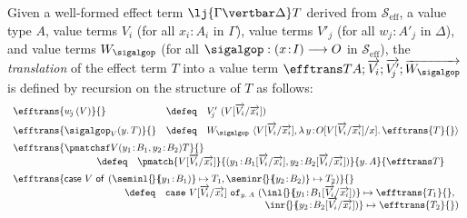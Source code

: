 \begin{definition}
\label{def:transofefftermstovalueterms}
Given a well-formed effect term $\lj {\Gamma \vertbar \Delta} T$ derived from $\mathcal{S}_{\text{eff}}$, a value type $A$, value terms $V_{i}$ (for all $x_i \!:\! A_i$ in $\Gamma$), value terms $V'_{\!j}$ (for all $w_{\!j} \!:\! A'_{\!j}$ in $\Delta$), and value terms $W_{\sigalgop}$ (for all $\sigalgop : (x \!:\! I) \longrightarrow O$ in $\mathcal{S}_{\text{eff}}$), the \emph{translation} of the effect term $T$ into a value term $\efftrans T {A; \overrightarrow{V_i}; \overrightarrow{V'_{\!j}}; \overrightarrow{W_{\sigalgop}}}$ is defined by recursion on the structure of $T$ as follows:
\[
\begin{array}{l c l}
\efftrans {w_{\!j}\, (V)} {} & \defeq & V'_{\!j}\,\, (V[\overrightarrow{V_i}/\overrightarrow{x_i}])
\\[2mm]
\efftrans {\sigalgop_V(y .\, T)} {} & \defeq & W_{\sigalgop}\,\, \langle V[\overrightarrow{V_i}/\overrightarrow{x_i}] , \lambda\, y \!:\! O[V[\overrightarrow{V_i}/\overrightarrow{x_i}]/x] .\, \efftrans {T} {}\rangle
\\[2mm]
\multicolumn{3}{l}{\efftrans {\pmatchsf V {(y_1 \!:\! B_1, y_2 \!:\! B_2)} {} T} {}}
\\
\multicolumn{3}{l}{\hspace{3cm} \defeq \,\,\,\,\,\, \pmatch {V[\overrightarrow{V_i}/\overrightarrow{x_i}]} {(y_1 \!:\! B_1[\overrightarrow{V_i}/\overrightarrow{x_i}], y_2 \!:\! B_2[\overrightarrow{V_i}/\overrightarrow{x_i}])} {y .\, A} {\efftrans T {}} }
\\[2mm]
\multicolumn{3}{l}{\efftrans {\mathsf{case~} V \mathsf{~of}_{} \mathsf{~} ({\seminl {\!} {\!\!(y_1 \!:\! B_1)} \mapsto T_1}, {\seminr {\!} {\!\!(y_2 \!:\! B_2)} \mapsto T_2})} {}}
\\
\multicolumn{3}{l}{\hspace{4cm} \defeq \,\,\,\,\,\, \mathtt{case~} V[\overrightarrow{V_i}/\overrightarrow{x_i}] \mathtt{~of}_{y.\,A} \mathtt{~} ({\inl {\!} {\!\!(y_1 \!:\! B_1[\overrightarrow{V_i}/\overrightarrow{x_i}])} \mapsto \efftrans {T_1} {}},} \\[-0.5mm]
\multicolumn{3}{l}{\hfill {\inr {\!} {\!\!(y_2 \!:\! B_2[\overrightarrow{V_i}/\overrightarrow{x_i}])} \mapsto \efftrans {T_2} {}})}
\end{array}
\]

\end{definition}
